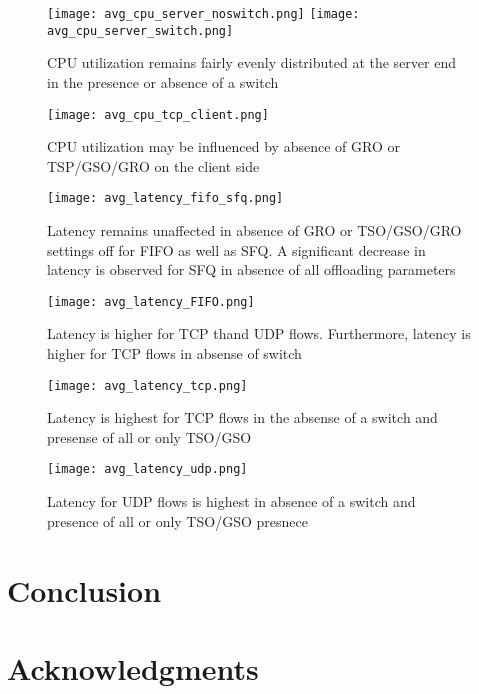 \begin{figure}[t] 
\texttt{[image: avg\_cpu\_server\_noswitch.png]}
\texttt{[image: avg\_cpu\_server\_switch.png]}
\caption{CPU utilization remains fairly evenly distributed at the server end
in the presence or absence of a switch} 
\label{fig:avg_cpu_server_noswitch}
\end{figure}

\begin{figure}[t] 
\texttt{[image: avg\_cpu\_tcp\_client.png]}
\caption{CPU utilization may be influenced by absence of GRO or TSP/GSO/GRO on
the client side} 
\label{fig:avg_cpu_tcp_client}
\end{figure}

\begin{figure}[t] 
\texttt{[image: avg\_latency\_fifo\_sfq.png]}
\caption{Latency remains unaffected in absence of GRO or TSO/GSO/GRO settings
off for FIFO as well as SFQ. A significant decrease in latency is observed for
SFQ in absence of all offloading parameters} 
\label{fig:avg_latency_fifo_sfq}
\end{figure}


\begin{figure}[t] 
\texttt{[image: avg\_latency\_FIFO.png]}
\caption{Latency is higher for TCP thand UDP flows. Furthermore, latency is
higher for TCP flows in absense of switch} 
\label{fig:avg_latency_FIFO}
\end{figure}


\begin{figure}[t] 
\texttt{[image: avg\_latency\_tcp.png]}
\caption{Latency is highest for TCP flows in the absense of a switch and
presense of all or only TSO/GSO} 
\label{fig:avg_latency_tcp}
\end{figure}


\begin{figure}[t] 
\texttt{[image: avg\_latency\_udp.png]}
\caption{Latency for UDP flows is highest in absence of a switch and presence of
all or only TSO/GSO presnece
} 
\label{fig:avg_latency_udp}
\end{figure}

\section{Conclusion}

\section{Acknowledgments}

